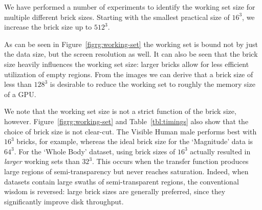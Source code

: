 We have performed a number of experiments to identify the working set
size for multiple different brick sizes.  Starting with the smallest
practical size of $16^3$, we increase the brick size up to $512^3$.

As can be seen in Figure~\ref{figrg:working-set} the working set is bound
not by just the data size, but the screen resolution as well.  It can
also be seen that the brick size heavily influences the working set
size: larger bricks allow for less efficient utilization of empty
regions. From the images we can derive that a brick size of less than
$128^3$ is desirable to reduce the working set to roughly the memory
size of a GPU.

We note that the working set size is not a strict function of the brick
size, however.  Figure~\ref{figrg:working-set} and
Table~\ref{tbl:timings} also show that the choice of brick size is not
clear-cut.  The Visible Human male performs best with $16^3$ bricks,
for example, whereas the ideal brick size for the `Magnitude' data is
$64^3$.  For the `Whole Body' dataset, using brick sizes of
$16^3$ actually resulted in \emph{larger} working sets than $32^3$.
This occurs when the transfer function produces large regions
of semi-transparency but never reaches saturation.  Indeed, when datasets
contain large swaths of semi-transparent regions, the conventional
wisdom is reversed: large brick sizes are generally preferred, since
they significantly improve disk throughput.

%


